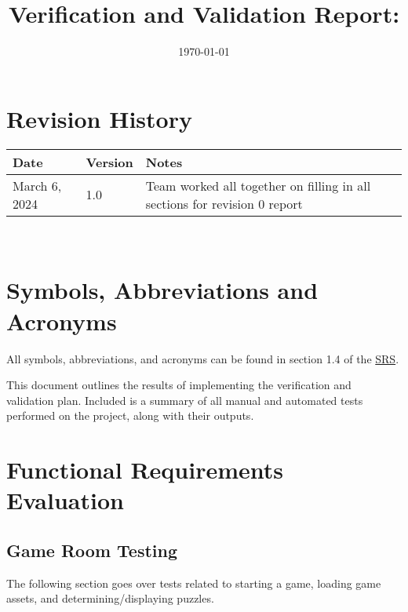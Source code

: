 \documentclass[12pt, titlepage]{article}
\begin{document}
\title{Verification and Validation Report: \progname} 
\author{\authname}
\date{\today}
	
\maketitle


\section{Revision History}

\begin{tabularx}{\textwidth}{p{3cm}p{2cm}X}
\toprule {\bf Date} & {\bf Version} & {\bf Notes}\\
\midrule
March 6, 2024 & 1.0 & Team worked all together on filling in all sections for revision 0 report\\
\bottomrule
\end{tabularx}

~\newpage

\section{Symbols, Abbreviations and Acronyms}

\renewcommand{\arraystretch}{1.2}
All  symbols, abbreviations, and acronyms can be found in section 1.4 of the  \href{https://github.com/SammyG7/Mac-AR/blob/main/docs/SRS/SRS.pdf}{SRS}.


\newpage

\tableofcontents

\listoftables %

\newpage


This document outlines the results of implementing the verification and validation plan. Included is a summary of all manual and automated tests performed on the project, along with their outputs. 

\section{Functional Requirements Evaluation}

\subsection{Game Room Testing}
The following section goes over tests related to starting a game, loading game assets, and determining/displaying puzzles.
\end{document}
